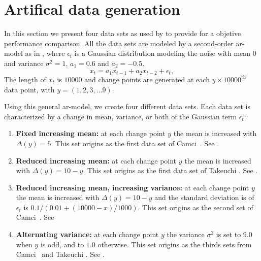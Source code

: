 \section{Artifical data generation}\label{sec:artificial_data_generation}
In this section we present four data sets as used by \cite{camci2010change,takeuchi2006unifying} to provide for a objetive performance comparison.
All the data sets are modeled by a second-order \gls{ar}-model as in , where $\epsilon_t$ is a Gaussian distribution modeling the noise with mean $0$ and variance $\sigma^2 = 1$, $a_1 = 0.6$ and $a_2 = -0.5$.
\begin{equation}\label{eq:artificial_data_sets_model}
  x_t = a_1 x_{t-1} + a_2 x_{t-2} + \epsilon_t,
\end{equation}
The length of $x_t$ is $10000$ and change points are generated at each $y \times 10000^\text{th}$ data point, with $y = (1, 2, 3, \dots 9)$.

Using this general \gls{ar}-model, we create four different data sets.
Each data set is characterized by a change in mean, variance, or both of the Gaussian term $\epsilon_t$:
\begin{enumerate}
  \item \textbf{Fixed increasing mean:} at each change point $y$ the mean is increased with $\Delta(y) = 5$.
  This set origins as the first data set of Camci~\cite{camci2010change}.
  See .

  \item \textbf{Reduced increasing mean:} at each change point $y$ the mean is increased with $\Delta(y) = 10 - y$.
  This set origins as the first data set of Takeuchi \etal \cite{takeuchi2006unifying}.
  See .

  \item \textbf{Reduced increasing mean, increasing variance:} at each change point $y$ the mean is increased with $\Delta(y) = 10 - y$ and the standard deviation is of $\epsilon_t$ is $0.1 / (0.01 + (10000 - x)/1000)$.
  This set origins as the second set of Camci~\cite{camci2010change}.
  See 

  \item \textbf{Alternating variance:} at each change point $y$ the variance $\sigma^2$ is set to $9.0$ when $y$ is odd, and to $1.0$ otherwise.
  This set origins as the thirds sets from Camci~\cite{camci2010change} and Takeuchi \etal \cite{takeuchi2006unifying}.
  See .
\end{enumerate}


